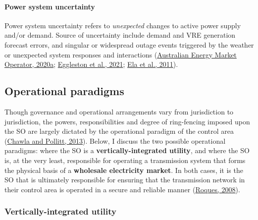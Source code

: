 \documentclass[12pt,a4paper,]{report}
\begin{document}
\hypertarget{power-system-uncertainty}{%
\paragraph{Power system uncertainty}\label{power-system-uncertainty}}

Power system uncertainty refers to \emph{unexpected} changes to active
power supply and/or demand. Source of uncertainty include demand and VRE
generation forecast errors, and singular or widespread outage events
triggered by the weather or unexpected system responses and interactions
(\protect\hyperlink{ref-australianenergymarketoperatorRenewableIntegrationStudy2020}{Australian
Energy Market Operator, 2020a};
\protect\hyperlink{ref-egglestonSecurityResilienceTechnical2021}{Eggleston
et al., 2021};
\protect\hyperlink{ref-elaOperatingReservesVariable2011}{Ela et al.,
2011}).

\hypertarget{sec:lit_review-operational_paradigms}{%
\subsection{Operational
paradigms}\label{sec:lit_review-operational_paradigms}}

Though governance and operational arrangements vary from jurisdiction to
jurisdiction, the powers, responsibilities and degree of ring-fencing
imposed upon the SO are largely dictated by the operational paradigm of
the control area
(\protect\hyperlink{ref-chawlaGlobalTrendsElectricity2013}{Chawla and
Pollitt, 2013}). Below, I discuss the two possible operational
paradigms: where the SO is a \textbf{vertically-integrated utility}, and
where the SO is, at the very least, responsible for operating a
transmission system that forms the physical basis of a \textbf{wholesale
electricity market}. In both cases, it is the SO that is ultimately
responsible for ensuring that the transmission network in their control
area is operated in a secure and reliable manner
(\protect\hyperlink{ref-roquesMarketDesignGeneration2008}{Roques,
2008}).

\hypertarget{vertically-integrated-utility}{%
\subsubsection{Vertically-integrated
utility}\label{vertically-integrated-utility}}
\end{document}
